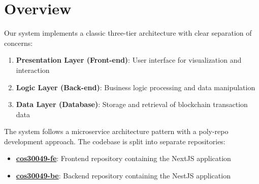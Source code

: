 \section{Overview}
Our system implements a classic three-tier architecture with clear separation of concerns:

\begin{enumerate}
    \item \textbf{Presentation Layer (Front-end)}: User interface for visualization and interaction
    \item \textbf{Logic Layer (Back-end)}: Business logic processing and data manipulation
    \item \textbf{Data Layer (Database)}: Storage and retrieval of blockchain transaction data
\end{enumerate}

The system follows a microservice architecture pattern with a poly-repo development approach. The codebase is split into separate repositories:
\begin{itemize}
    \item \textbf{\href{https://github.com/SwinHCMC-COS30049/cos30049-fe}{cos30049-fe}}: Frontend repository containing the NextJS application
    \item \textbf{\href{https://github.com/SwinHCMC-COS30049/cos30049-be}{cos30049-be}}: Backend repository containing the NestJS application
\end{itemize}

